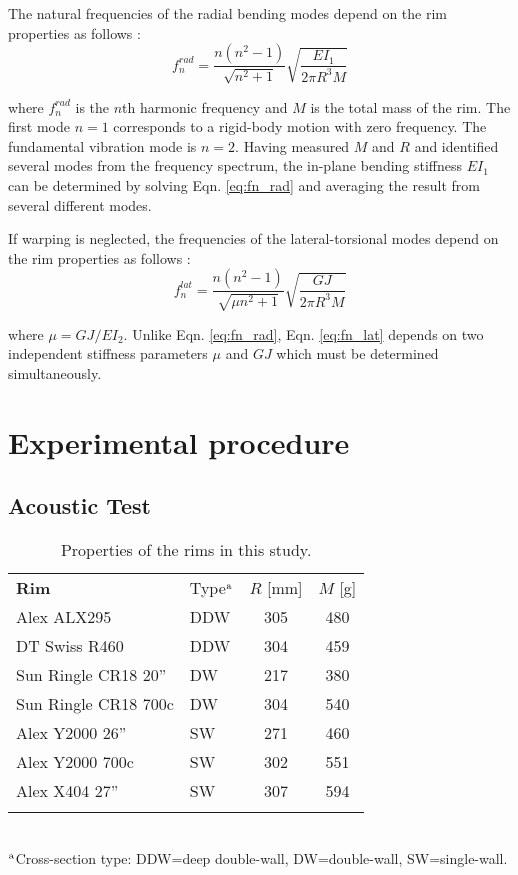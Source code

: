 \documentclass[../thesis.tex]{subfiles}
\begin{document}
The natural frequencies of the radial bending modes depend on the rim properties as follows \cite{Timoshenko1955}:
  \begin{equation}\label{eq:fn_rad}
  f_n^{rad} = \frac{n(n^2-1)}{\sqrt{n^2+1}} \sqrt{\frac{EI_1}{2\pi R^3M}}
  \end{equation}

where $f_n^{rad}$ is the $n$th harmonic frequency and $M$ is the total mass of the rim. The first mode $n=1$ corresponds to a rigid-body motion with zero frequency. The fundamental vibration mode is $n=2$. Having measured $M$ and $R$ and identified several modes from the frequency spectrum, the in-plane bending stiffness $EI_1$ can be determined by solving Eqn. \ref{eq:fn_rad} and averaging the result from several different modes.

If warping is neglected, the frequencies of the lateral-torsional modes depend on the rim properties as follows \cite{Timoshenko1955}:
  \begin{equation}\label{eq:fn_lat}
  f_n^{lat} = \frac{n(n^2-1)}{\sqrt{\mu n^2+1}} \sqrt{\frac{GJ}{2\pi R^3M}}
  \end{equation}

where $\mu=GJ/EI_{2}$. Unlike Eqn. \ref{eq:fn_rad}, Eqn. \ref{eq:fn_lat} depends on two independent stiffness parameters $\mu$ and $GJ$ which must be determined simultaneously.


\section{Experimental procedure}

\subsection{Acoustic Test}

  \begin{table}
  \caption{Properties of the rims in this study.\label{tb:rims}}
  \begin{tabular}{@{}llcc}
  \hline\noalign{\smallskip}
  \bf{Rim} & Type$^{\rm a}$ & $R$ [mm] & $M$ [g]\\
  \noalign{\smallskip}\hline\noalign{\smallskip}
  Alex ALX295          & DDW & 305 & 480\\
  DT Swiss R460        & DDW & 304 & 459\\
  Sun Ringle CR18 20'' & DW  & 217 & 380\\
  Sun Ringle CR18 700c & DW  & 304 & 540\\
  Alex Y2000 26''      & SW  & 271 & 460\\
  Alex Y2000 700c      & SW  & 302 & 551\\
  Alex X404 27''       & SW  & 307 & 594\\
  \noalign{\smallskip}\hline
  \end{tabular}\\
  $^{\rm a}$Cross-section type: DDW=deep double-wall, DW=double-wall, SW=single-wall.
  \end{table}
\end{document}
